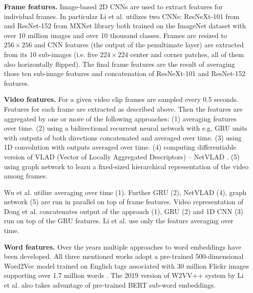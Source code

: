 \begin{description}[labelwidth=1em, leftmargin=!]
    \item \textbf{Frame features.} Image-based 2D CNNs are used to extract features for individual frames. In particular Li et al. utilizes two CNNs: ResNeXt-101 from \cite{ImageNetShuffle} and ResNet-152 from MXNet library \cite{mxnet} %
    both trained on the ImageNet dataset with over 10 million images and over 10 thousand classes.
    Frames are resized to $256\times 256$ and CNN features (the output of the penultimate layer) are extracted from its 10 sub-images (i.e. five $224\times 224$ center and corner patches, all of them also horizontally flipped). The final frame features are the result of averaging those ten sub-image features and concatenation of ResNeXt-101 and ResNet-152 features.

    \item \textbf{Video features.} For a given video clip frames are sampled every 0.5 seconds. Features for each frame are extracted as described above. Then the features are aggregated by one or more of the following approaches: (1) averaging features over time. (2) using a bidirectional recurrent neural network with e.g. GRU units with outputs of both directions concatenated and averaged over time. (3) using 1D convolution with outputs averaged over time. (4) computing differentiable version of VLAD (Vector of Locally Aggregated Descriptors) -- NetVLAD \cite{Arandjelovic_2016_CVPR}. (5) using graph network \cite{Mao_2018_ECCV_Workshops} to learn a fixed-sized hierarchical representation of the video among frames.
    
    Wu et al. \cite{wu2019hybrid} utilize averaging over time (1). Further GRU (2), NetVLAD (4), graph network (5) are run in parallel on top of frame features.
    Video representation of Dong et al. \cite{Dong_2019_CVPR} concatenates output of the approach (1), GRU (2) and 1D CNN (3) run on top of the GRU features. Li et al. \cite{XirongW2VVpp} use only the feature averaging over time.
    
    \item \textbf{Word features.} Over the years multiple approaches to word embeddings have been developed. All three mentioned works adopt a pre-trained 500-dimensional Word2Vec model trained on English tags associated with 30 million Flickr images supporting over 1.7 million words \cite{Dong2018}. The 2019 version \cite{li2019renmin} of W2VV++ system by Li et al. also takes advantage of pre-trained BERT \cite{bert} sub-word embeddings.
    

\end{description}
